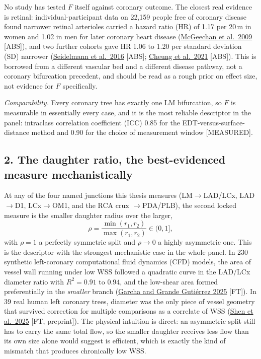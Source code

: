 \documentclass[11pt]{article}
\begin{document}
No study has tested $F$ itself against coronary outcome. The closest real evidence is retinal:
individual-participant data on 22{,}159 people free of coronary disease found narrower retinal
arterioles carried a hazard ratio (HR) of 1.17 per 20\,\textmu m in women and 1.02 in men for later
coronary heart disease
(\href{https://pubmed.ncbi.nlm.nih.gov/19755365/}{McGeechan et al.\ 2009} [ABS]), and two further
cohorts gave HR 1.06 to 1.20 per standard deviation (SD) narrower
(\href{https://pubmed.ncbi.nlm.nih.gov/27682886/}{Seidelmann et al.\ 2016} [ABS];
\href{https://doi.org/10.1038/s41551-020-00626-4}{Cheung et al.\ 2021} [ABS]). This is borrowed from
a different vascular bed and a different disease pathway, not a coronary bifurcation precedent, and
should be read as a rough prior on effect size, not evidence for $F$ specifically.

\emph{Comparability.} Every coronary tree has exactly one LM bifurcation, so $F$ is measurable in
essentially every case, and it is the most reliable descriptor in the panel: intraclass correlation
coefficient (ICC) 0.85 for the EDT-versus-surface-distance method and 0.90 for the choice of
measurement window [MEASURED].

\subsection*{2. The daughter ratio, the best-evidenced measure mechanistically}

At any of the four named junctions this thesis measures (LM$\to$LAD/LCx, LAD$\to$D1,
LCx$\to$OM1, and the RCA crux $\to$PDA/PLB), the second locked measure is the smaller daughter
radius over the larger,
\begin{equation}
  \rho = \frac{\min(r_1, r_2)}{\max(r_1, r_2)} \in (0, 1] ,
  \label{eq:daughter-ratio}
\end{equation}
with $\rho=1$ a perfectly symmetric split and $\rho \to 0$ a highly asymmetric one. This is the
descriptor with the strongest mechanistic case in the whole panel. In 230 synthetic left-coronary
computational fluid dynamics (CFD) models, the area of vessel wall running under low WSS followed a
quadratic curve in the LAD/LCx diameter ratio with $R^2 = 0.91$ to $0.94$, and the low-shear area
formed preferentially in the \emph{smaller} branch
(\href{https://pmc.ncbi.nlm.nih.gov/articles/PMC11770140/}{Garcha and Grande Guti\'errez 2025}
[FT]). In 39 real human left coronary trees, diameter was the only piece of vessel geometry that
survived correction for multiple comparisons as a correlate of WSS
(\href{https://arxiv.org/abs/2502.06161}{Shen et al.\ 2025} [FT, preprint]). The physical intuition
is direct: an asymmetric split still has to carry the same total flow, so the smaller daughter
receives less flow than its own size alone would suggest is efficient, which is exactly the kind of
mismatch that produces chronically low WSS.
\end{document}
